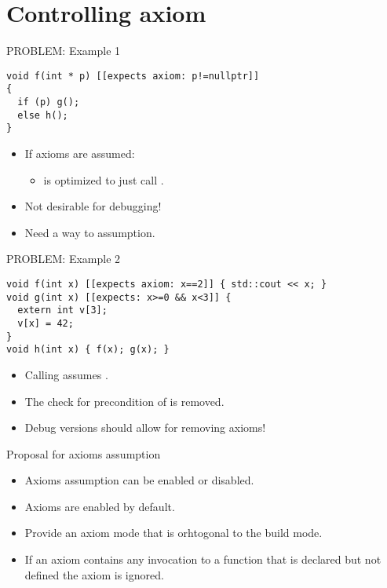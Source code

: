 \section{Controlling axiom}

\begin{frame}[t,fragile]{PROBLEM: Example 1}
\begin{block}{}
\begin{lstlisting}
void f(int * p) [[expects axiom: p!=nullptr]]
{
  if (p) g();
  else h();
}
\end{lstlisting}
\end{block}

\begin{itemize}
  \item If axioms are assumed:
    \begin{itemize}
      \item {} is optimized to just call .
    \end{itemize}
  \item \alert{Not desirable for debugging!}
  \item Need a way to  assumption.
\end{itemize}
\end{frame}

\begin{frame}[t,fragile]{PROBLEM: Example 2}
\begin{block}{}
\begin{lstlisting}
void f(int x) [[expects axiom: x==2]] { std::cout << x; }
void g(int x) [[expects: x>=0 && x<3]] {
  extern int v[3];
  v[x] = 42;
}
void h(int x) { f(x); g(x); }
\end{lstlisting}
\end{block}
\begin{itemize}
  \item Calling  assumes .
  \item The check for precondition of  is \alert{removed}.
  \item Debug versions should allow for removing axioms!
\end{itemize}
\end{frame}

\begin{frame}[t]{Proposal for axioms assumption}
\begin{itemize}
\item Axioms assumption can be enabled or disabled.
\item Axioms are enabled by default.
\item Provide an axiom mode that is orhtogonal to the build mode.
\item If an axiom contains any invocation to a function that is declared
      but not defined the axiom is ignored. 
\end{itemize}
\end{frame}
